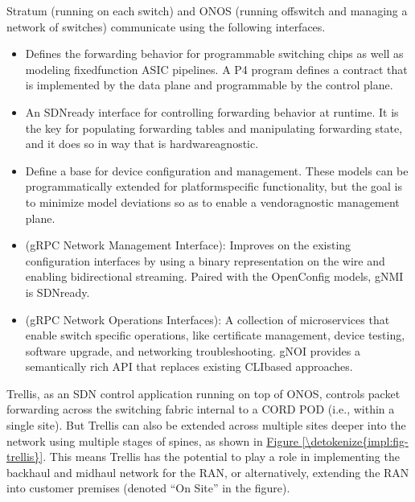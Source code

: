 \documentclass[a4paper,11pt,english]{sphinxmanual}
\begin{document}
\sphinxAtStartPar
Stratum (running on each switch) and ONOS (running off\sphinxhyphen{}switch and
managing a network of switches) communicate using the following
interfaces.
\begin{itemize}
\item {} 
\sphinxAtStartPar
{} Defines the forwarding behavior for programmable switching
chips as well as modeling fixed\sphinxhyphen{}function ASIC pipelines. A P4 program
defines a contract that is implemented by the data plane and
programmable by the control plane.

\item {} 
\sphinxAtStartPar
{} An SDN\sphinxhyphen{}ready interface for controlling forwarding
behavior at runtime. It is the key for populating forwarding tables
and manipulating forwarding state, and it does so in way that is
hardware\sphinxhyphen{}agnostic.

\item {} 
\sphinxAtStartPar
{} Define a base for device configuration and
management. These models can be programmatically extended for
platform\sphinxhyphen{}specific functionality, but the goal is to minimize model
deviations so as to enable a vendor\sphinxhyphen{}agnostic management plane.

\item {} 
\sphinxAtStartPar
{} (gRPC Network Management Interface): Improves on the
existing configuration interfaces by using a binary representation on
the wire and enabling bi\sphinxhyphen{}directional streaming. Paired with the
OpenConfig models, gNMI is SDN\sphinxhyphen{}ready.

\item {} 
\sphinxAtStartPar
{} (gRPC Network Operations Interfaces): A collection of
microservices that enable switch specific operations, like
certificate management, device testing, software upgrade, and
networking troubleshooting. gNOI provides a semantically rich API
that replaces existing CLI\sphinxhyphen{}based approaches.

\end{itemize}

\sphinxAtStartPar
Trellis, as an SDN control application running on top of ONOS, controls
packet forwarding across the switching fabric internal to a CORD POD
(i.e., within a single site). But Trellis can also be extended across
multiple sites deeper into the network using multiple stages of spines,
as shown in \hyperref[\detokenize{impl:fig-trellis}]{Figure \ref{\detokenize{impl:fig-trellis}}}. This means Trellis has the
potential to play a role in implementing the backhaul and midhaul
network for the RAN, or alternatively, extending the RAN into customer
premises (denoted “On Site” in the figure).
\end{document}
